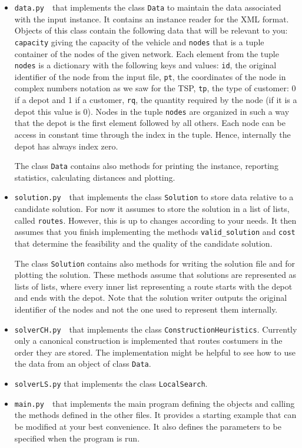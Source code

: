 \begin{itemize}
\item \lstinline{data.py}\ \  that implements the class \lstinline{Data} to
  maintain the data associated with the input instance. It contains an
  instance reader for the XML format. Objects of this class contain the
  following data that will be relevant to you:
  \lstinline{capacity} giving the capacity of the vehicle and \lstinline{nodes}
that is a tuple container of the nodes of the given network. Each
element from the tuple \lstinline{nodes} is a dictionary with the
following keys and values: \verb!id!, the original identifier of the
node from the input file, \verb!pt!, the coordinates of the node in
complex numbers notation as we saw for the TSP, \verb!tp!, the type of
customer: 0 if a depot and 1 if a customer, \verb!rq!, the quantity
required by the node (if it is a depot this value is 0).
Nodes in the tuple \lstinline{nodes} are organized in such a way that
the depot is the first element followed by all others. Each node can be
access in constant time through the index in the tuple. Hence,
internally the depot has always index zero.     

The class \lstinline{Data} contains also methods for printing the
instance, reporting statistics, calculating distances and plotting.

\item \lstinline{solution.py}\ \  that implements the class \lstinline{Solution}
  to store data relative to a candidate solution. For now it assumes to
  store the solution in a list of lists, called
  \lstinline{routes}. However, this is up to changes according to your
  needs. It then assumes that you finish implementing the methods
  \lstinline{valid_solution} and \lstinline{cost} that determine the
  feasibility and the quality of the candidate solution.

The class \lstinline{Solution} contains also methods for writing the
solution file and for plotting the solution. These methods assume that
solutions are represented as lists of lists, where every inner list
representing a route starts with the depot and ends with the depot.
Note that the solution writer outputs the original identifier of the
nodes and not the one used to represent them internally.

\item \lstinline{solverCH.py}\ \  that implements the class
  \lstinline{ConstructionHeuristics}. Currently only a canonical
  construction is implemented that routes costumers in the order they
  are stored. The implementation might be helpful to see how to use the
  data from an object of class \lstinline{Data}.  
\item \lstinline{solverLS.py} that implements the class
  \lstinline{LocalSearch}.
\item \lstinline{main.py}\ \  that implements the main program defining the
  objects and calling the methods defined in the other files. It
  provides a starting example that can be modified at your best
  convenience. It also defines the parameters to be specified when the
  program is run. 
\end{itemize}


